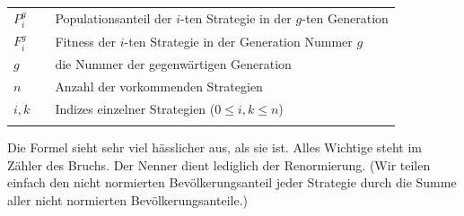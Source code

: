 \begin{tabular}{lll}
$P_i^g$ & & Populationsanteil der $i$-ten Strategie in der $g$-ten Generation \\
$F_i^g$ & & Fitness der $i$-ten Strategie in der Generation Nummer $g$ \\
$g$ & & die Nummer der gegenwärtigen Generation \\
  $n$ & & Anzahl der vorkommenden Strategien \\
  $i,k$ & & Indizes einzelner Strategien ($0 \leq i,k \leq n$) \\
  & &\\
\end{tabular} 

Die Formel sieht sehr viel hässlicher aus, als sie ist. Alles Wichtige steht im
Zähler des Bruchs. Der Nenner dient lediglich der Renormierung. (Wir teilen
einfach den nicht normierten Bevölkerungsanteil jeder Strategie durch die Summe
aller nicht normierten Bevölkerungsanteile.)

